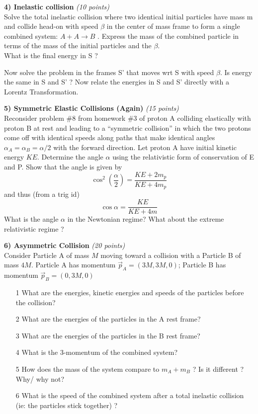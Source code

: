 {\vspace*{0.25in}

\textbf{4) Inelastic collision } \hfill \textit{(10 points)}\\
Solve the total inelastic collision where two identical initial particles have mass m and collide head-on with speed $\beta$ in the center of mass frame to form a single combined system: $A + A \rightarrow B$ . 
Express the mass of the combined particle in terms of the mass of the initial particles and the $\beta$.\\
What is the final energy in S ?

Now solve the problem in the frames S' that moves wrt S with speed $\beta$. 
Is energy the same in S and S' ?
Now relate the energies in S and S' directly with a Lorentz Transformation.


\textbf{5) Symmetric Elastic Collisions (Again) } \hfill \textit{(15 points)}\\
Reconsider problem \#8 from homework \#3 of proton A colliding elastically with proton B at rest and leading to a ``symmetric collision'' in which the two protons come off with identical speeds along paths that make identical angles $\alpha_A = \alpha_B = \alpha/2$ with the forward direction.
Let proton A have initial kinetic energy $KE$.  
Determine the angle $\alpha$ using the relativistic form of conservation of E and P. 
Show that the angle is given by
\begin{equation*}
\cos^2\left( \frac{\alpha}{2}\right) = \frac{KE + 2m_p}{KE + 4m_p}
\end{equation*}
and thus (from a trig id)
\begin{equation*}
\cos \alpha = \frac{KE}{ KE + 4m}
\end{equation*}
What is the angle $\alpha$ in the Newtonian regime? What about the extreme relativistic regime ?

\vspace*{0.25in}

\textbf{6) Asymmetric Collision  } \hfill \textit{(20 points)}\\
Consider Particle A of mass $M$ moving toward a collision with a Particle B of mass $4M$.
Particle A has momentum $\vec{p}_A=(3M,3M,0)$; Particle B has momentum $\vec{p}_B=(0,3M,0)$
\begin{itemize}
\item[1] What are the energies, kinetic energies and speeds of the particles before the collision?  
\item[2] What are the energies of the particles in the A rest frame?
\item[3] What are the energies of the particles in the B rest frame?
\item[4] What is the 3-momentum of the combined system?
\item[5] How does the mass of the system compare to $m_A + m_B$ ? Is it different ? Why/ why not?
\item[6] What is the speed of the combined system after a total inelastic collision (ie: the particles stick together) ?
\end{itemize}


}

